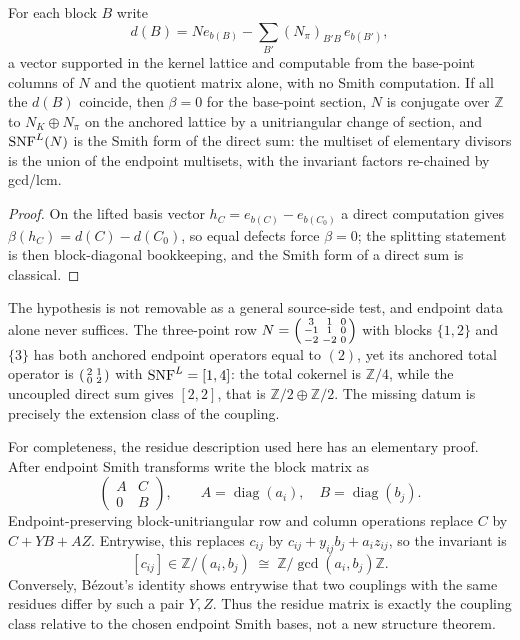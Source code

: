 \begin{proposition}\label{prop:source-coupling}
For each block \(B\) write
\[
  d(B)=N e_{b(B)}-\sum_{B'}(N_\pi)_{B'B}\,e_{b(B')},
\]
a vector supported in the kernel lattice and computable from the base-point columns of \(N\) and the quotient matrix alone, with no Smith computation.  If all the \(d(B)\) coincide, then \(\beta=0\) for the base-point section, \(N\) is conjugate over \(\mathbb Z\) to \(N_K\oplus N_\pi\) on the anchored lattice by a unitriangular change of section, and \(\operatorname{SNF}^{L}(N)\) is the Smith form of the direct sum: the multiset of elementary divisors is the union of the endpoint multisets, with the invariant factors re-chained by gcd/lcm.
\end{proposition}

\begin{proof}
On the lifted basis vector \(h_C=e_{b(C)}-e_{b(C_0)}\) a direct computation gives \(\beta(h_C)=d(C)-d(C_0)\), so equal defects force \(\beta=0\); the splitting statement is then block-diagonal bookkeeping, and the Smith form of a direct sum is classical.
\end{proof}

The hypothesis is not removable as a general source-side test, and endpoint data alone never suffices.  The three-point row
\(N=\begin{psmallmatrix}3&1&0\\-1&1&0\\-2&-2&0\end{psmallmatrix}\)
with blocks \(\{1,2\}\) and \(\{3\}\) has both anchored endpoint operators equal to \((2)\), yet its anchored total operator is \(\begin{psmallmatrix}2&1\\0&2\end{psmallmatrix}\) with \(\operatorname{SNF}^{L}=[1,4]\): the total cokernel is \(\mathbb Z/4\), while the uncoupled direct sum gives \([2,2]\), that is \(\mathbb Z/2\oplus\mathbb Z/2\).  The missing datum is precisely the extension class of the coupling.

For completeness, the residue description used here has an elementary proof.  After endpoint Smith transforms write the block matrix as
\[
  \begin{pmatrix}A&C\\0&B\end{pmatrix},
  \qquad A=\operatorname{diag}(a_i),\quad B=\operatorname{diag}(b_j).
\]
Endpoint-preserving block-unitriangular row and column operations replace \(C\) by \(C+YB+AZ\).  Entrywise, this replaces \(c_{ij}\) by \(c_{ij}+y_{ij}b_j+a_i z_{ij}\), so the invariant is
\[
  [c_{ij}]\in \mathbb Z/(a_i,b_j)
  \;\cong\;
  \mathbb Z/\gcd(a_i,b_j)\mathbb Z.
\]
Conversely, B\'ezout's identity shows entrywise that two couplings with the same residues differ by such a pair \(Y,Z\).  Thus the residue matrix is exactly the coupling class relative to the chosen endpoint Smith bases, not a new structure theorem.

